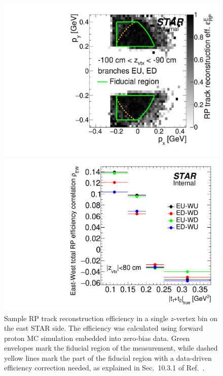 \begin{figure}[ht!]%
\centering%
\begin{minipage}{.4725\textwidth}%
  \centering%
  \includegraphics[width=\linewidth,page=10]{graphics/corrections/mcFullEffPxPy.pdf}%
  \caption[Sample RP track reconstruction efficiency in a single $z$-vertex bin.]{Sample RP track reconstruction efficiency in a single $z$-vertex bin on the east STAR side. The efficiency was calculated using forward proton MC simulation embedded into zero-bias data. Green envelopes mark the fiducial region of the measurement, while dashed yellow lines mark the part of the fiducial region with a data-driven efficiency correction needed, as explained in Sec.~10.3.1 of Ref.~\cite{supplementaryNote}.}\label{fig:rpEffSample}
\end{minipage}%
\quad\quad%
\begin{minipage}{.4725\textwidth}%
  \centering%
  \includegraphics[width=\linewidth]{graphics/corrections/RpTotalEffEastWestCorrelationVsMandelstamTSum.pdf}%

\end{minipage}
\end{figure}
